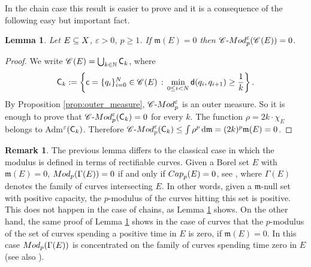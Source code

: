 \documentclass[12pt]{amsart}
\newcommand{\N}{\mathbb{N}}
\newcommand{\R}{\mathbb{R}}
\newcommand{\sfd}{{\sf d}}
\renewcommand{\d}{{\mathrm d}}
\newcommand{\X}{{\rm X}}
\newcommand{\mm}{\mathfrak m}
\newtheorem{lemma}[theorem]{Lemma}
\theoremstyle{definition}
\newtheorem{remark}[theorem]{Remark}
\newcommand{\cModepsilon}[2]{{\mathscr C}\text{-}{\rm Mod}_{#2}^{#1}}
\newcommand{\sfc}{{\sf c}}
\newcommand{\sfC}{{\sf C}}
\newcommand{\Chain}[1]{\mathscr{C}^{#1}}
\begin{document}
In the chain case this result is easier to prove and it is a consequence of the following easy but important fact. 
\begin{lemma}
\label{lemma:measure_zero_implies_modulezero}
    Let $E\subseteq \X$, $\varepsilon > 0$, $p\ge 1$. If $\mm(E) = 0$ then $\cModepsilon{\varepsilon}{p}(\Chain{}(E)) = 0$.
\end{lemma}
\begin{proof}
    We write
    $\Chain{}(E) = \bigcup_{k\in \N} \sfC_k$, where
    $$\sfC_k := \left\{ \sfc = \{q_i\}_{i=0}^N \in \Chain{}(E) \,:\, \min_{0\le i < N} \sfd(q_i,q_{i+1}) \geq \frac{1}{k} \right\}.$$
    By Proposition \ref{prop:outer_measure}, $\cModepsilon{\varepsilon}{p}$ is an outer measure. So it is enough to prove that $\cModepsilon{\varepsilon}{p}(\sfC_k) = 0$ for every $k$. The function $\rho = 2k\cdot \chi_E$ belongs to Adm$^{\varepsilon}(\sfC_k)$. Therefore $\cModepsilon{\varepsilon}{p}(\sfC_k) \le \int \rho^p\,\d\mm = (2k)^p\mm(E)=0$.
\end{proof}


\begin{remark}
    The previous lemma differs to the classical case in which the modulus is defined in terms of rectifiable curves. Given a Borel set $E$ with $\mm(E)=0$, ${\rm Mod}_p(\Gamma(E))=0$ if and only if ${\rm Cap}_p(E)=0$, see \cite[Prop.\ 7.2.8]{HKST15}, where $\Gamma(E)$ denotes the family of curves intersecting $E$. In other words, given a $\mm$-null set with positive capacity, the $p$-modulus of the curves hitting this set is positive. This does not happen in the case of chains, as Lemma \ref{lemma:measure_zero_implies_modulezero} shows. 
    On the other hand, the same proof of Lemma \ref{lemma:measure_zero_implies_modulezero} shows in the case of curves that the $p$-modulus of the set of curves spending a positive time in $E$ is zero, if $\mm(E) = 0$. In this case ${\rm Mod}_p(\Gamma(E))$ is concentrated on the family of curves spending time zero in $E$ (see also \cite[Lemma 5.2.15]{HKST15}). 
\end{remark}
\end{document}
